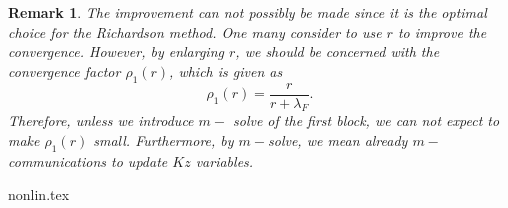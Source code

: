 \documentclass{article}
\newtheorem{remark}{Remark}
\theoremstyle{definition}
\begin{document}
\begin{remark} 
The improvement can not possibly be made since it is the optimal choice for the Richardson method. One many consider to use $r$ to improve the convergence. However, by enlarging $r$, we should be concerned with the convergence factor $\rho_1(r)$, which is given as 
\begin{equation}
\rho_1(r) = \frac{r}{r + \lambda_F}. 
\end{equation}
Therefore, unless we introduce $m-$ solve of the first block, we can not expect to make $\rho_1(r)$ small. Furthermore, by $m-$solve, we mean already $m-$ communications to update $Kz$ variables. 
\end{remark} 


{nonlin.tex} 


\end{document}
